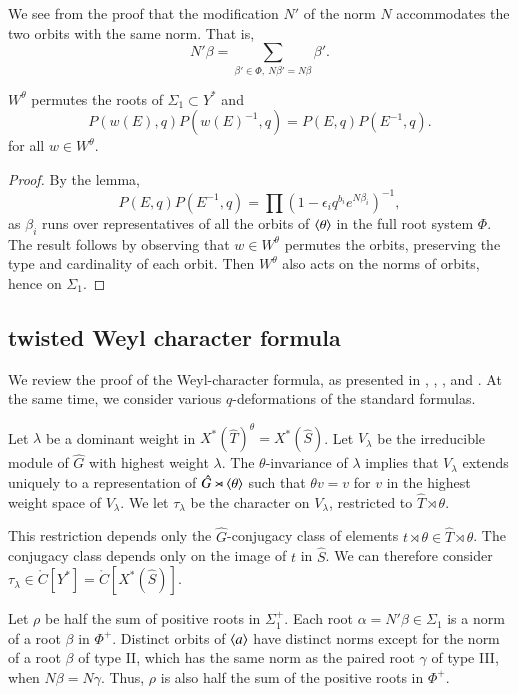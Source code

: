 We see from the proof 
that the modification $N'$ of the norm $N$  accommodates the
two orbits with the same norm.  That is,
\[
N'\beta = \sum_{\beta'\in \Phi, ~N\beta' = N\beta} \beta'.
\]

\begin{corollary}\label{cor:weyl-p}  $W^\theta$ permutes the roots of $\Sigma_1\subset Y^*$ and
\[
P(w(E),q) P(w(E)^{-1},q) = P(E,q)P(E^{-1},q).
\]
for all $w\in W^\theta$.
\end{corollary}

\begin{proof} 
By the lemma,
\[
P(E,q)P(E^{-1},q) = \prod (1- \epsilon_i q^{b_i} e^{N\beta_i})^{-1},
\]
as $\beta_i$ runs over representatives of all the orbits of $\langle{\theta}\rangle$ in the full root system $\Phi$.
The result follows by observing  that $w\in W^\theta$ permutes the orbits, preserving the type and cardinality of each orbit.
Then $W^\theta$ also acts on the norms of orbits, hence on $\Sigma_1$.
\end{proof}


\subsection{twisted Weyl character formula}

We review the proof of the Weyl-character formula, as presented in \cite{kostant1961lie}, 
\cite{jantzen1977darstellungen}, \cite{wendt2001weyl}, and \cite{kumar2009characters}.
At the same time, we consider various $q$-deformations of the standard formulas.

Let $\lambda$ be a dominant weight in $X^*(\hat T)^\theta = X^*(\hat S)$.  Let $V_\lambda$ be the irreducible module
of $\hat G$ with highest weight $\lambda$.  The $\theta$-invariance of $\lambda$ implies that $V_\lambda$
extends uniquely to a representation of $\hat G \rtimes \langle{\theta}\rangle$ such that $\theta v = v$ for $v$ in the
highest weight space of $V_\lambda$.  We let $\tau_\lambda$ be the character on $V_\lambda$, restricted to $\hat T\rtimes\theta$.

This restriction depends only the $\hat G$-conjugacy class of elements $t\rtimes \theta\in \hat T\rtimes\theta$.
The conjugacy class depends only on the image of $t$ in $\hat S$.  
We can therefore
consider $\tau_\lambda\in \ring{C}[Y^*] = \ring{C}[X^*(\hat S)]$.

Let $\rho$ be half the sum of positive roots in $\Sigma^+_1$.  Each root $\alpha = N'\beta\in \Sigma_1$ 
is a norm of a root $\beta$ in $\Phi^+$.
Distinct orbits of $\langle{a}\rangle$ have distinct norms except for the norm of a root $\beta$ of type II, which has the same norm as the
paired root $\gamma$ of type III, when $N\beta = N\gamma$.  Thus, $\rho$ is also half the sum of the positive roots in $\Phi^+$.

